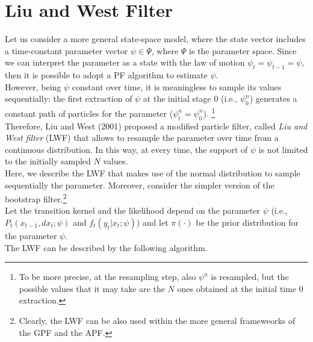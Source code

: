 \documentclass[
]{book}
\theoremstyle{break}
\theoremstyle{nonumberplain}
\begin{document}
\section{Liu and West Filter}\label{pf_lui_west}

Let us consider a more general state-space model, where the state vector
includes a time-constant parameter vector \(\psi \in \Psi\), where
\(\Psi\) is the parameter space. Since we can interpret the parameter as
a state with the law of motion \(\psi_t=\psi_{t-1}=\psi\), then it is
possible to adopt a PF algorithm to estimate \(\psi\).\\
However, being \(\psi\) constant over time, it is meaningless to sample
its values sequentially: the first extraction of \(\psi\) at the initial
stage 0 (i.e., \(\psi_0^n\)) generates a constant path of particles for
the parameter (\(\psi_t^n=\psi_0^n\)).
\footnote{To be more precise, at the resampling step, also $\psi^n$ is resampled, but the possible values that it may take are the $N$ ones obtained at the initial time 0 extraction.}\\
Therefore, Liu and West (2001) proposed a modified particle filter,
called \textit{Liu and West filter} (LWF) that allows to resample the
parameter over time from a continuous distribution. In this way, at
every time, the support of \(\psi\) is not limited to the initially
sampled \(N\) values.\\
Here, we describe the LWF that makes use of the normal distribution to
sample sequentially the parameter. Moreover, consider the simpler
version of the bootstrap
filter.\footnote{Clearly, the LWF can be also used within the more general frameweorks of the GPF and the APF.}\\
Let the transition kernel and the likelihood depend on the parameter
\(\psi\) (i.e., \(P_t(x_{t-1},dx_t;\psi)\) and \(f_t(y_t|x_t;\psi)\))
and let \(\pi(\cdot)\) be the prior distribution for the parameter
\(\psi\).\\
The LWF can be described by the following algorithm.
\end{document}
